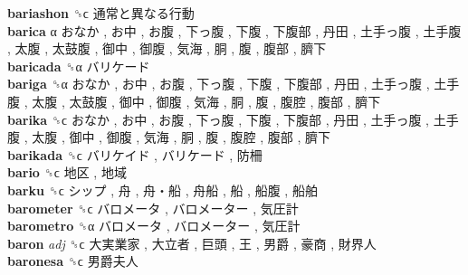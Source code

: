 \textbf{bariashon} ␝ϲ   通常と異なる行動   \\
\textbf{barica} α   おなか ,  お中 ,  お腹 ,  下っ腹 ,  下腹 ,  下腹部 ,  丹田 ,  土手っ腹 ,  土手腹 ,  太腹 ,  太鼓腹 ,  御中 ,  御腹 ,  気海 ,  胴 ,  腹 ,  腹部 ,  臍下   \\
\textbf{baricada} ␝α   バリケード   \\
\textbf{bariga} ␝α   おなか ,  お中 ,  お腹 ,  下っ腹 ,  下腹 ,  下腹部 ,  丹田 ,  土手っ腹 ,  土手腹 ,  太腹 ,  太鼓腹 ,  御中 ,  御腹 ,  気海 ,  胴 ,  腹 ,  腹腔 ,  腹部 ,  臍下   \\
\textbf{barika} ␝ϲ   おなか ,  お中 ,  お腹 ,  下っ腹 ,  下腹 ,  下腹部 ,  丹田 ,  土手っ腹 ,  土手腹 ,  太腹 ,  御中 ,  御腹 ,  気海 ,  胴 ,  腹 ,  腹腔 ,  腹部 ,  臍下   \\
\textbf{barikada} ␝ϲ   バリケイド ,  バリケード ,  防柵   \\
\textbf{bario} ␝ϲ   地区 ,  地域   \\
\textbf{barku} ␝ϲ   シップ ,  舟 ,  舟・船 ,  舟船 ,  船 ,  船腹 ,  船舶   \\
\textbf{barometer} ␝ϲ   バロメータ ,  バロメーター ,  気圧計   \\
\textbf{barometro} ␝α   バロメータ ,  バロメーター ,  気圧計   \\
\textbf{baron} \emph{adj}  ␝ϲ   大実業家 ,  大立者 ,  巨頭 ,  王 ,  男爵 ,  豪商 ,  財界人   \\
\textbf{baronesa} ␝ϲ   男爵夫人   \\
